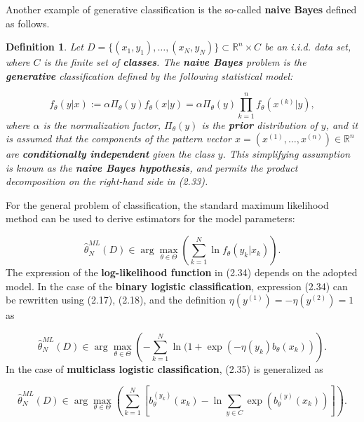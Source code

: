 \documentclass{report}
\newtheorem{definition}{Definition}[chapter]
\begin{document}
Another example of generative classification is the so-called \textbf{naive Bayes} defined as follows.

\begin{definition}
Let $D = \{(x_1,y_1),\dots,(x_N,y_N)\} \subset \mathbb{R}^n \times C$ be an i.i.d. data set, where $C$ is the finite set of \textbf{classes}. The \textbf{naive Bayes} problem is the \textbf{generative} classification defined by the following statistical model:

\begin{equation}
f_\theta(y|x) := \alpha \Pi_\theta(y) f_\theta(x|y) = \alpha \Pi_\theta(y) \prod_{k=1}^n f_\theta(x^{(k)}|y),
\end{equation}
where $\alpha$ is the normalization factor, $\Pi_\theta(y)$ is the \textbf{prior} distribution of $y$, and it is assumed that the components of the pattern vector $x = (x^{(1)},\dots,x^{(n)}) \in \mathbb{R}^n$ are \textbf{conditionally independent} given the class $y$. This simplifying assumption is known as the \textbf{naive Bayes hypothesis}, and permits the product decomposition on the right-hand side in (2.33).
\end{definition}
For the general problem of classification, the standard maximum likelihood method can be used to derive estimators for the model parameters:

\begin{equation}
\hat{\theta}^{ML}_N(D) \in \arg \max_{\theta \in \Theta} \left(\sum_{k=1}^N \ln f_\theta(y_k|x_k)\right).
\end{equation}
The expression of the \textbf{log-likelihood function} in (2.34) depends on the adopted model. In the case of the \textbf{binary logistic classification}, expression (2.34) can be rewritten using (2.17), (2.18), and the definition $\eta(y^{(1)}) = -\eta(y^{(2)}) = 1$ as

\begin{equation}
\hat{\theta}^{ML}_N(D) \in \arg \max_{\theta \in \Theta} \left(-\sum_{k=1}^N \ln(1+\exp(-\eta(y_k)b_\theta(x_k))\right).
\end{equation}
In the case of \textbf{multiclass logistic classification}, (2.35) is generalized as

\begin{equation}
\hat{\theta}^{ML}_N(D) \in \arg \max_{\theta \in \Theta} \left(
\sum_{k=1}^N\left[b_\theta^{(y_k)}(x_k) - \ln \sum_{y \in C} \exp(b_\theta^{(y)}(x_k))\right]\right).
\end{equation}
\end{document}
